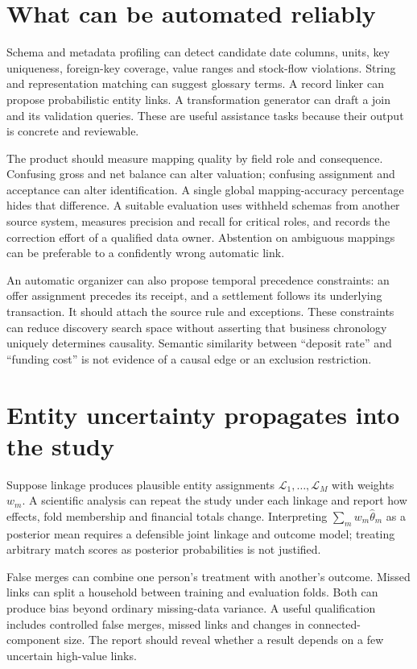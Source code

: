 \section{What can be automated reliably}
Schema and metadata profiling can detect candidate date columns, units,
key uniqueness, foreign-key coverage, value ranges and stock-flow violations.
String and representation matching can suggest glossary terms. A record
linker can propose probabilistic entity links. A transformation generator
can draft a join and its validation queries. These are useful assistance
tasks because their output is concrete and reviewable.

The product should measure mapping quality by field role and consequence.
Confusing gross and net balance can alter valuation; confusing assignment
and acceptance can alter identification. A single global mapping-accuracy
percentage hides that difference. A suitable evaluation uses withheld
schemas from another source system, measures precision and recall for
critical roles, and records the correction effort of a qualified data owner.
Abstention on ambiguous mappings can be preferable to a confidently wrong
automatic link.

An automatic organizer can also propose temporal precedence constraints:
an offer assignment precedes its receipt, and a settlement follows its
underlying transaction. It should attach the source rule and exceptions.
These constraints can reduce discovery search space without asserting that
business chronology uniquely determines causality. Semantic similarity
between ``deposit rate'' and ``funding cost'' is not evidence of a causal
edge or an exclusion restriction.

\section{Entity uncertainty propagates into the study}
Suppose linkage produces plausible entity assignments
$\mathcal L_1,\ldots,\mathcal L_M$ with weights $w_m$. A scientific
analysis can repeat the study under each linkage and report how effects,
fold membership and financial totals change. Interpreting
$\sum_m w_m\widehat\theta_m$ as a posterior mean requires a
defensible joint linkage and outcome model; treating arbitrary match scores
as posterior probabilities is not justified.

False merges can combine one person's treatment with another's outcome.
Missed links can split a household between training and evaluation folds.
Both can produce bias beyond ordinary missing-data variance. A useful
qualification includes controlled false merges, missed links and changes
in connected-component size. The report should reveal whether a result
depends on a few uncertain high-value links.

